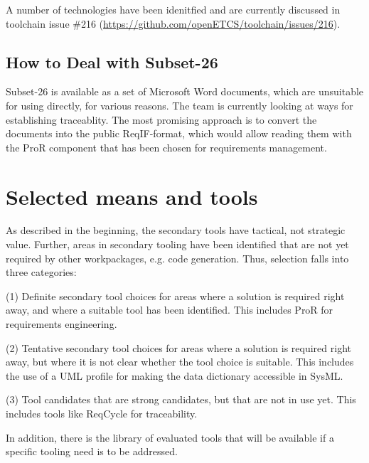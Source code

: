 A number of technologies have been idenitfied and are currently discussed in toolchain issue \#216 (\url{https://github.com/openETCS/toolchain/issues/216}).

\subsection{How to Deal with Subset-26}

Subset-26 is available as a set of Microsoft Word documents, which are unsuitable for using directly, for various reasons.  The team is currently looking at ways for establishing traceablity.  The most promising approach is to convert the documents into the public ReqIF-format, which would allow reading them with the ProR component that has been chosen for requirements management.

%
%

\section{Selected means and tools}

As described in the beginning, the secondary tools have tactical, not strategic value.  Further, areas in secondary tooling have been identified that are not yet required by other workpackages, e.g. code generation.  Thus, selection falls into three categories:

(1) Definite secondary tool choices for areas where a solution is required right away, and where a suitable tool has been identified.  This includes ProR for requirements engineering.

(2) Tentative secondary tool choices for areas where a solution is required right away, but where it is not clear whether the tool choice is suitable.  This includes the use of a UML profile for making the data dictionary accessible in SysML.

(3) Tool candidates that are strong candidates, but that are not in use yet.  This includes tools like ReqCycle for traceability.

In addition, there is the library of evaluated tools that will be available if a specific tooling need is to be addressed.

